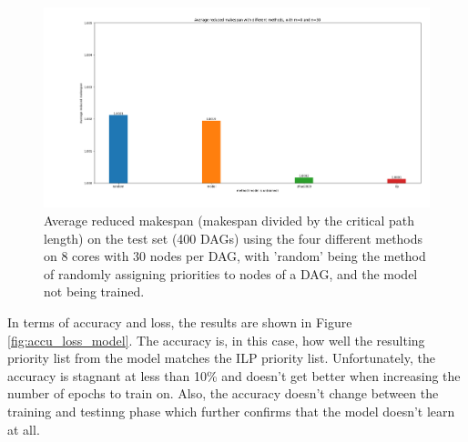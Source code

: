 \begin{figure}
    \centering
    \includegraphics[width=\linewidth]{images/avg_makespan_m8n30_untrained.png}
    \caption{Average reduced makespan (makespan divided by the critical path length) on the test set (400 DAGs) using the four different methods
    on 8 cores with 30 nodes per DAG,
    with 'random' being the method of randomly assigning priorities to nodes of a DAG,
    and the model not being trained.}
    \label{fig:avg_makespan_comparison_untrained}
\end{figure}


In terms of accuracy and loss, the results are shown in Figure \ref{fig:accu_loss_model}.
The accuracy is, in this case, how well the resulting priority list 
from the model matches the ILP priority list.
Unfortunately, the accuracy is stagnant at less than 10\%
and doesn't get better when increasing the number of epochs to train on. 
Also, the accuracy doesn't change between the training and testinng phase
which further confirms that the model doesn't learn at all.


